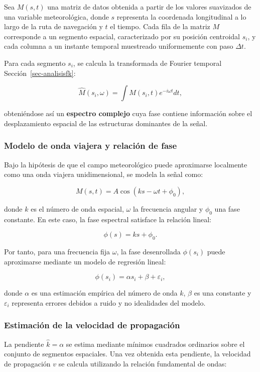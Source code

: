 \documentclass[
  spanish,
  us-letterpaper,
]{scrreprt}
\numberwithin{equation}{section}
\begin{document}
Sea \(M(s,t)\) una matriz de datos obtenida a partir de los valores
suavizados de una variable meteorológica, donde \(s\) representa la
coordenada longitudinal a lo largo de la ruta de navegación y \(t\) el
tiempo. Cada fila de la matriz \(M\) corresponde a un segmento espacial,
caracterizado por su posición centroidal \(s_i\), y cada columna a un
instante temporal muestreado uniformemente con paso \(\Delta t\).

Para cada segmento \(s_i\), se calcula la transformada de Fourier
temporal Sección~\ref{sec-analisisfk}:

\[
\hat{M}(s_i,\omega) = \int M(s_i,t) e^{-i\omega t} dt,
\]

obteniéndose así un \textbf{espectro complejo} cuya fase contiene
información sobre el desplazamiento espacial de las estructuras
dominantes de la señal.

\subsubsection{Modelo de onda viajera y relación de
fase}\label{modelo-de-onda-viajera-y-relaciuxf3n-de-fase-1}

Bajo la hipótesis de que el campo meteorológico puede aproximarse
localmente como una onda viajera unidimensional, se modela la señal
como:

\[
M(s,t) = A \cos(ks - \omega t + \phi_0),
\]

donde \(k\) es el número de onda espacial, \(\omega\) la frecuencia
angular y \(\phi_0\) una fase constante. En este caso, la fase espectral
satisface la relación lineal:

\[
\phi(s) = ks + \phi_0.
\]

Por tanto, para una frecuencia fija \(\omega\), la fase desenrollada
\(\phi(s_i)\) puede aproximarse mediante un modelo de regresión lineal:

\[
\phi(s_i) = \alpha s_i + \beta + \varepsilon_i,
\]

donde \(\alpha\) es una estimación empírica del número de onda \(k\),
\(\beta\) es una constante y \(\varepsilon_i\) representa errores
debidos a ruido y no idealidades del modelo.

\subsubsection{Estimación de la velocidad de
propagación}\label{estimaciuxf3n-de-la-velocidad-de-propagaciuxf3n}

La pendiente \(\hat{k} = \alpha\) se estima mediante mínimos cuadrados
ordinarios sobre el conjunto de segmentos espaciales. Una vez obtenida
esta pendiente, la velocidad de propagación \(v\) se calcula utilizando
la relación fundamental de ondas:
\end{document}
